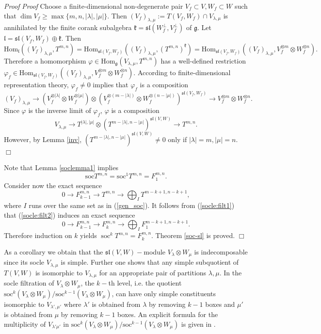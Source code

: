 \documentclass[10pt]{amsart}
\renewenvironment{proof}{ \emph{Proof}}{$\Box$}
\renewcommand{\sl}{\mathfrak{sl}}
\newcommand{\kk}{\mathfrak{k}}
\renewcommand{\gg}{\mathfrak{g}}
\renewcommand {\phi} {\varphi}
\newcommand{\Hom}{\mathrm{Hom}}
\begin{document}
\begin{proof}
\begin{proof} Choose a finite-dimensional non-degenerate pair $V_f\subset V, W_f\subset W$ such that $\dim V_f\geq \operatorname{max}\lbrace m,n,|\lambda|,|\mu|\rbrace$. Then $(V_f)_{\lambda,\mu}:=T(V_f,W_f)\cap V_{\lambda,\mu}$ is annihilated by the finite corank subalgebra $\kk=\sl(W_f^\perp,V_f^\perp)$ of $\gg$. Let $\mathfrak l=\sl(V_f,W_f)\oplus \kk$. Then $$\Hom_{\mathfrak l}((V_f)_{\lambda,\mu},T^{m,n})=\Hom_{\sl(V_f,W_f)}((V_f)_{\lambda,\mu},(T^{m,n})^\kk)=\Hom_{\sl(V_f,W_f)}((V_f)_{\lambda,\mu},V_f^{\otimes m}\otimes W_f^{\otimes n}).$$ Therefore a homomorphism $\varphi\in\Hom_\gg(V_{\lambda,\mu}, T^{m,n})$ has a well-defined restriction $\varphi_f\in \Hom_{\sl(V_f,W_f)}((V_f)_{\lambda,\mu},V_f^{\otimes m}\otimes W_f^{\otimes n})$. According to finite-dimensional representation theory, $\phi_f\neq 0$ implies that $\varphi_f$ is a composition 
$$(V_f)_{\lambda,\mu}\to (V_f^{\otimes|\lambda|} \otimes W_f^{\otimes|\mu|})\otimes(V_f^{\otimes(m-|\lambda|)}\otimes W_f^{\otimes(n-|\mu|)})^{\sl(V_f,W_f)}\xrightarrow{} V_f^{\otimes m}\otimes W_f^{\otimes n}.$$ 
Since $\varphi$ is the inverse limit of $\varphi_f$, $\varphi$ is a composition 
$$V_{\lambda,\mu} \to T^{|\lambda|,|\mu|}\otimes  (T^{m-|\lambda|,n-|\mu|})^{\sl(V,W)}\xrightarrow{} T^{m,n}.$$ 
However, by Lemma \ref{inv}, $(T^{m-|\lambda|,n-|\mu|})^{\sl(V,W)}\neq 0$ only if  $|\lambda|=m,|\mu|=n$.
\end{proof}

Note that Lemma \ref{soclemma1} implies 
\begin{equation}\label{socle:filt1}
 \mathrm{soc}T^{m,n}=\mathrm{soc}^1T^{m,n}=F_1^{m,n}.
\end{equation}
Consider now the exact sequence
\begin{equation}\label{socle:filt2}
 0\to F^{m,n}_{k-1}\to T^{m,n}\to \bigoplus_I T^{m-k+1,n-k+1},
\end{equation}
where $I$ runs over the same set as in (\ref{gen_soc}).
It follows from (\ref{socle:filt1}) that (\ref{socle:filt2}) induces an exact sequence
$$0\to F^{m,n}_{k-1}\to F^{m,n}_{k}\to \bigoplus_I F^{m-k+1,n-k+1}_1.$$
Therefore induction on $k$ yields $\operatorname{soc}^{k}T^{m,n}=F^{m,n}_{k}$.
Theorem \ref{soc-sl} is proved.
\end{proof}

As a corollary we obtain that the $\sl(V,W)-$module $V_{\lambda}
\otimes W_{\mu}$ is indecomposable since its socle 
$V_{\lambda,\mu}$ is simple. Further one shows that any simple
subquotient of $T(V,W)$ is isomorphic to 
$V_{\lambda,\mu}$ for an appropriate pair of partitions $\lambda,
\mu.$ In the socle filtration of $V_{\lambda} \otimes W_\mu$, the
$k-$th level, i.e. the quotient $\mathrm{soc}^k(V_{\lambda} \otimes W_\mu)/\mathrm{soc}^{k-1}(V_{\lambda}\otimes W_\mu)$, can 
have only simple constituents isomorphic to $V_{\lambda',\mu'}$ where $\lambda'$ is obtained from $\lambda$ by removing $k-1$ boxes and $\mu'$ is obtained from $\mu$ by removing $k-1$ boxes. An explicit formula for the multiplicity of $V_{\lambda' \mu'}$ in  $\mathrm{soc}^k(V_{\lambda} \otimes W_{\mu})/\mathrm{soc}^{k-1}(V_{\lambda}\otimes W_\mu)$ is given in \cite{pstyr}.
\end{document}
